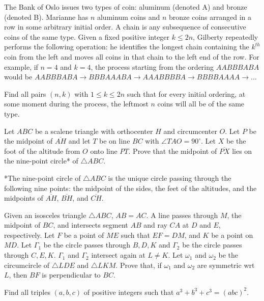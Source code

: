 \documentclass[11pt]{scrartcl}
\begin{document}
\begin{problem}[587866144613888]
The Bank of Oslo issues two types of coin: aluminum (denoted A) and bronze (denoted B). Marianne has $n$ aluminum coins and $n$ bronze coins arranged in a row in some arbitrary initial order. A chain is any subsequence of consecutive coins of the same type. Given a fixed positive integer $k \leq 2n$, Gilberty repeatedly performs the following operation: he identifies the longest chain containing the $k^{th}$ coin from the left and moves all coins in that chain to the left end of the row. For example, if $n=4$ and $k=4$, the process starting from the ordering $AABBBABA$ would be $AABBBABA \to BBBAAABA \to AAABBBBA \to BBBBAAAA \to ...$

Find all pairs $(n,k)$ with $1 \leq k \leq 2n$ such that for every initial ordering, at some moment during the process, the leftmost $n$ coins will all be of the same type.
\end{problem}
\begin{problem}[528087142744727]
	Let $ABC$ be a scalene triangle with orthocenter $H$ and circumcenter $O$. Let $P$ be the midpoint of $\overline{AH}$ and let $T$ be on line $BC$ with $\angle TAO=90^{\circ}$. Let $X$ be the foot of the altitude from $O$ onto line $PT$. Prove that the midpoint of $\overline{PX}$ lies on the nine-point circle* of $\triangle ABC$.

*The nine-point circle of $\triangle ABC$ is the unique circle passing through the following nine points: the midpoint of the sides, the feet of the altitudes, and the midpoints of $\overline{AH}$, $\overline{BH}$, and $\overline{CH}$.
\end{problem}
\begin{problem}[1620616963605432410]
Given an isosceles triangle $\triangle ABC$, $AB=AC$. A line passes through $M$, the midpoint of $BC$, and intersects segment $AB$ and ray $CA$ at $D$ and $E$, respectively. Let $F$ be a point of $ME$ such that $EF=DM$, and $K$ be a point on $MD$. Let $\Gamma_1$ be the circle passes through $B,D,K$ and $\Gamma_2$ be the circle passes through $C,E,K$. $\Gamma_1$ and $\Gamma_2$ intersect again at $L \neq K$. Let $\omega_1$ and $\omega_2$ be the circumcircle of $\triangle LDE$ and $\triangle LKM$. Prove that, if $\omega_1$ and $\omega_2$ are symmetric wrt $L$, then $BF$ is perpendicular to $BC$.
\end{problem}
\begin{problem}[7088779505939683183]
Find all triples $(a, b, c)$ of positive integers such that $a^3 + b^3 + c^3 = (abc)^2$.
\end{problem}
\end{document}

